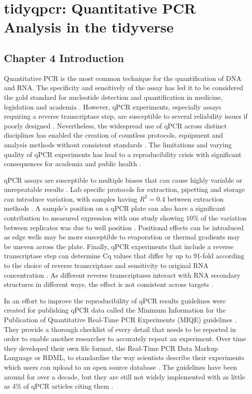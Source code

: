 \documentclass[../main.tex]{subfiles}
\begin{document}
\chapter{tidyqpcr: Quantitative PCR Analysis in the tidyverse}

\section{Chapter 4 Introduction}

Quantitative PCR is the most common technique for the quantification of DNA and RNA. 
The specificity and sensitively of the assay has led it to be considered the gold standard for nucleotide detection and quantification in medicine, legislation and academia \parencite{Kubista2006}.
However, qPCR experiments, especially assays requiring a reverse transcriptase step, are susceptible to several reliability issues if poorly designed \parencite{Bustin2002}.
Nevertheless, the widespread use of qPCR across distinct disciplines has enabled the creation of countless protocols, equipment and analysis methods without consistent standards \parencite{Bustin2021}.
The limitations and varying quality of qPCR experiments has lead to a reproducibility crisis with significant consequences for academia \parencite{Garson2009} and public health \parencite{Bustin2013}. 

qPCR assays are susceptible to multiple biases that can cause highly variable or unrepeatable results \parencite{Bustin2002}.
Lab specific protocols for extraction, pipetting and storage can introduce variation, with samples having $R^2 = 0.4$ between extraction methods \parencite{Bustin2017, Dagnall2017}.
A sample's position on a qPCR plate can also have a significant contribution to measured expression with one study showing $10\%$ of the variation between replicates was due to well position \parencite{Eisenberg2015}. 
Positional effects can be introduced as edge wells may be more susceptible to evaporation or thermal gradients may be uneven across the plate. 
Finally, qPCR experiments that include a reverse transcriptase step can determine Cq values that differ by up to 91-fold according to the choice of reverse transcriptase and sensitivity to original RNA concentration \parencite{Stahlberg2004}.
As different reverse transcriptases interact with RNA secondary structures in different ways, the effect is not consistent across targets \parencite{Brooks1995, Williams1992}.

In an effort to improve the reproducibility of qPCR results guidelines were created for publishing qPCR data called the Minimum Information for the Publication of Quantitative Real-Time PCR Experiments (MIQE) guidelines \parencite{Bustin2009}.
They provide a thorough checklist of every detail that needs to be reported in order to enable another researcher to accurately repeat an experiment. 
Over time they developed their own file format, the Real-Time PCR Data Markup Language or RDML, to standardise the way scientists describe their experiments which users can upload to an open source database \parencite{Lefever2009, Ruijter2015}.
The guidelines have been around for over a decade, but they are still not widely implemented with as little as $4\%$ of qPCR articles citing them \parencite{AbdelNour2020}.
\end{document}
